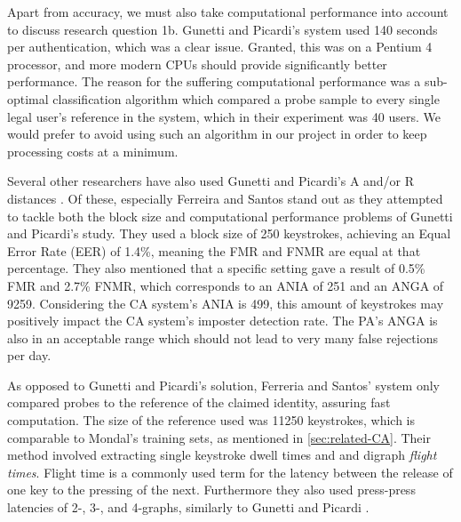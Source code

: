 \documentclass[informationsecurity]{gucmasterproject}
\begin{document}
Apart from accuracy, we must also take computational performance into account to discuss research question 1b.
Gunetti and Picardi's \cite{gnp} system used 140 seconds per authentication, which was a clear issue.
Granted, this was on a Pentium 4 processor, and more modern CPUs should provide significantly better performance.
The reason for the suffering computational performance was a sub-optimal classification algorithm which compared a probe sample to every single legal user's reference in the system, which in their experiment was 40 users.
We would prefer to avoid using such an algorithm in our project in order to keep processing costs at a minimum.

Several other researchers have also used Gunetti and Picardi's A and/or R distances \cite{Kolakowska2011, Messerman, meaningless, hu, davoudi2009, davoudi2010, superResults, Pinto2014, sliding}.
Of these, especially Ferreira and Santos \cite{superResults} stand out as they attempted to tackle both the block size and computational performance problems of Gunetti and Picardi's \cite{gnp} study.
They used a block size of 250 keystrokes, achieving an Equal Error Rate (EER) of 1.4\%, meaning the FMR and FNMR are equal at that percentage.
They also mentioned that a specific setting gave a result of 0.5\% FMR and 2.7\% FNMR, which corresponds to an ANIA of 251 and an ANGA of 9259.
Considering the CA system's ANIA is 499, this amount of keystrokes may positively impact the CA system's imposter detection rate.
The PA's ANGA is also in an acceptable range which should not lead to very many false rejections per day.

As opposed to Gunetti and Picardi's solution, Ferreria and Santos' system only compared probes to the reference of the claimed identity, assuring fast computation.
The size of the reference used was 11250 keystrokes, which is comparable to Mondal's training sets, as mentioned in \cref{sec:related-CA}.
Their method involved extracting single keystroke dwell times and and digraph \textit{flight times}.
Flight time is a commonly used term for the latency between the release of one key to the pressing of the next.
Furthermore they also used press-press latencies of 2-, 3-, and 4-graphs, similarly to Gunetti and Picardi \cite{gnp}.
\end{document}
